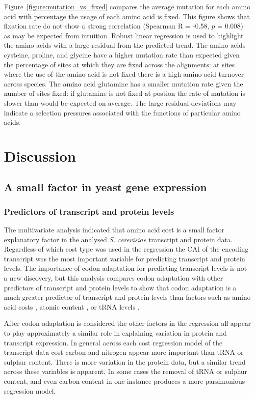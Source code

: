 Figure~\vref{figure:mutation_vs_fixed} compares the average mutation for each amino acid with percentage the usage of each amino acid is fixed. This figure shows that fixation rate do not show a strong correlation (Spearman R = -0.58, $p$ = 0.008) as may be expected from intuition. Robust linear regression is used to highlight the amino acids with a large residual from the predicted trend. The amino acids cysteine, proline, and glycine have a higher mutation rate than expected given the percentage of sites at which they are fixed across the alignments: at sites where the use of the amino acid is not fixed there is a high amino acid turnover across species. The amino acid glutamine has a smaller mutation rate given the number of sites fixed: if glutamine is not fixed at postion the rate of mutation is slower than would be expected on average. The large residual deviations may indicate a selection pressures associated with the functions of particular amino acids.

\clearpage

\section{Discussion}

\subsection{A small factor in yeast gene expression}

\subsubsection{Predictors of transcript and protein levels}

The multivariate analysis indicated that amino acid cost is a small factor explanatory factor in the analysed \emph{S. cerevisiae} transcript and protein data. Regardless of which cost type was used in the regression the CAI of the encoding transcript was the most important variable for predicting transcript and protein levels. The importance of codon adaptation for predicting transcript levels is not a new discovery, but this analysis compares codon adaptation with other predictors of transcript and protein levels to show that codon adaptation is a much greater predictor of transcript and protein levels than factors such as amino acid costs \cite{akashi2002}, atomic content \cite{mazel1989,baudoin2001}, or tRNA levels \cite{akashi2003}.

After codon adaptation is considered the other factors in the regression all appear to play approximately a similar role in explaining variation in protein and transcript expression. In general across each cost regression model of the transcript data cost carbon and nitrogen appear more important than tRNA or sulphur content. There is more variation in the protein data, but a similar trend across these variables is apparent. In some cases the removal of tRNA or sulphur content, and even carbon content in one instance produces a more parsimonious regression model. 

